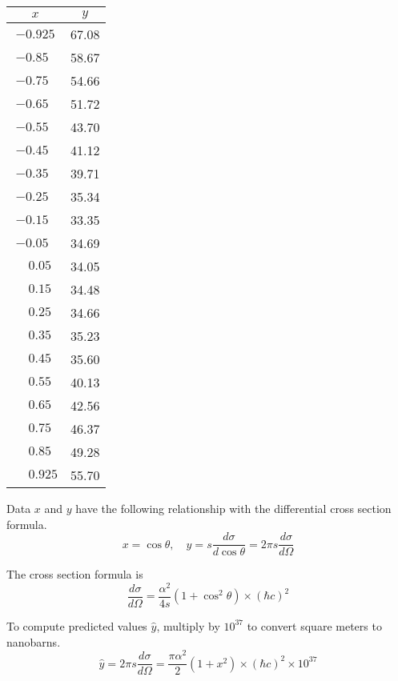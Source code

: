 \begin{center}
\begin{tabular}{|c|c|}
\hline
$x$ & $y$\\
\hline
$-0.925$ & 67.08\\
$-0.85\phantom{0}$ & 58.67\\
$-0.75\phantom{0}$ & 54.66\\
$-0.65\phantom{0}$ & 51.72\\
$-0.55\phantom{0}$ & 43.70\\
$-0.45\phantom{0}$ & 41.12\\
$-0.35\phantom{0}$ & 39.71\\
$-0.25\phantom{0}$ & 35.34\\
$-0.15\phantom{0}$ & 33.35\\
$-0.05\phantom{0}$ & 34.69\\
$\phantom{+}0.05\phantom{0}$ & 34.05\\
$\phantom{+}0.15\phantom{0}$ & 34.48\\
$\phantom{+}0.25\phantom{0}$ & 34.66\\
$\phantom{+}0.35\phantom{0}$ & 35.23\\
$\phantom{+}0.45\phantom{0}$ & 35.60\\
$\phantom{+}0.55\phantom{0}$ & 40.13\\
$\phantom{+}0.65\phantom{0}$ & 42.56\\
$\phantom{+}0.75\phantom{0}$ & 46.37\\
$\phantom{+}0.85\phantom{0}$ & 49.28\\
$\phantom{+}0.925$ & 55.70\\
\hline
\end{tabular}
\end{center}

Data $x$ and $y$ have the following relationship with the differential cross section formula.
\begin{equation*}
x=\cos\theta,
\quad
y=s\frac{d\sigma}{d\cos\theta}=2\pi s\frac{d\sigma}{d\Omega}
\end{equation*}

The cross section formula is
\begin{equation*}
\frac{d\sigma}{d\Omega}=\frac{\alpha^2}{4s}\left(1+\cos^2\theta\right)\times(\hbar c)^2
\end{equation*}

To compute predicted values $\hat{y}$, multiply by $10^{37}$ to convert square meters to nanobarns.
\begin{equation*}
\hat y=2\pi s\frac{d\sigma}{d\Omega}=\frac{\pi\alpha^2}{2}\left(1+x^2\right)\times(\hbar c)^2\times10^{37}
\end{equation*}

